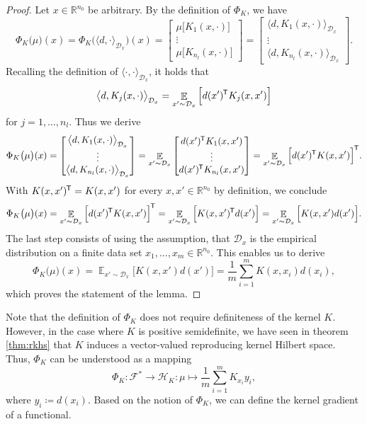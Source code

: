 \documentclass[11pt, a4paper]{article}
\newcommand{\R}{\mathbb{R}}
\newcommand{\D}{\mathcal{D}}
\newcommand{\F}{\mathcal{F}}
\renewcommand{\H}{\mathcal{H}}
\newcommand*{\tr}{^{\mkern-1.5mu\mathsf{T}}}
\DeclareMathOperator*{\E}{\mathbb{E}}
\begin{document}
\begin{proof}
Let $x \in \R^{n_0}$ be arbitrary. By the definition of $\Phi_K$, we have
\[ \Phi_K \big ( \mu \big )(x) = \Phi_K \Big ( \langle d, \cdot \rangle_{\D_x} \Big )(x) = \begin{bmatrix} \mu \big [K_1(x,\cdot) \big ] \\ \vdots \\ \mu \big [ K_{n_l}(x,\cdot) \big ] \end{bmatrix} = \begin{bmatrix} \big \langle d, K_1(x,\cdot) \big \rangle_{\D_x} \\ \vdots \\ \big \langle d, K_{n_l}(x,\cdot) \big \rangle_{\D_x} \end{bmatrix}. \]
Recalling the definition of $\langle \cdot , \cdot \rangle_{\D_x}$, it holds that
\[ \big \langle d, K_j(x,\cdot) \big \rangle_{\D_x} = \E_{x' \sim \D_x} \Big [ d(x')\tr K_j(x,x') \Big ] \]
for $j = 1, \dots, n_l$. Thus we derive
\[ \Phi_K \big ( \mu \big )(x) = \begin{bmatrix} \big \langle d, K_1(x,\cdot) \big \rangle_{\D_x} \\ \vdots \\ \big \langle d, K_{n_l}(x,\cdot) \big \rangle_{\D_x} \end{bmatrix} = \E_{x' \sim \D_x} \begin{bmatrix} d(x')\tr K_{1}(x,x') \\ \vdots \\ d(x')\tr K_{n_l}(x,x') \end{bmatrix} = \E_{x' \sim \D_x} \Big [ d(x')\tr  K(x,x') \Big ]\tr . \]
With $K(x,x')\tr  = K(x,x')$ for every $x,x' \in \R^{n_0}$ by definition, we conclude
\[ \Phi_K \big ( \mu \big )(x) = \E_{x' \sim \D_x} \Big [ d(x')\tr  K(x,x') \Big ]\tr  = \E_{x' \sim \D_x} \Big [ K(x,x')\tr d(x') \Big ] = \E_{x' \sim \D_x} \Big [ K(x,x')d(x') \Big ]. \]
The last step consists of using the assumption, that $\D_x$ is the empirical distribution on a finite data set $x_1, \dots, x_m \in \R^{n_0}$. This enables us to derive
\[ \Phi_K \big ( \mu \big )(x) = \E_{x' \sim \D_x} \Big [ K(x,x')d(x') \Big ] = \frac{1}{m}\sum_{i=1}^{m} K(x,x_i)d(x_i), \]
which proves the statement of the lemma.
\end{proof}

Note that the definition of $\Phi_K$ does not require definiteness of the kernel $K$. However, in the case where $K$ is positive semidefinite, we have seen in theorem \ref{thm:rkhs} that $K$ induces a vector-valued reproducing kernel Hilbert space. Thus, $\Phi_K$ can be understood as a mapping
\[ \Phi_K: \F^* \to \H_K : \mu \mapsto \frac{1}{m} \sum_{i=1}^{m} K_{x_i}y_i, \]
where $y_i \coloneq d(x_i)$. Based on the notion of $\Phi_K$, we can define the kernel gradient of a functional.
\end{document}
